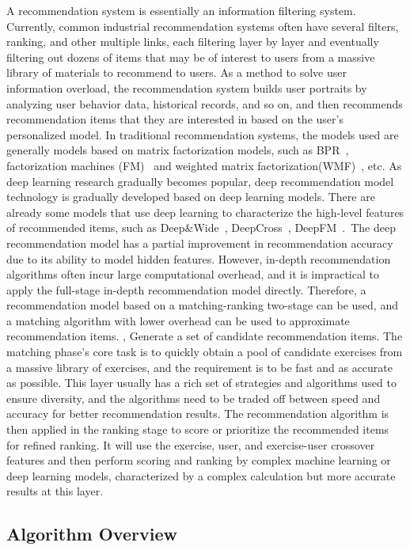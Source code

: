 A recommendation system is essentially an information filtering system. Currently, common industrial recommendation systems often have several filters, ranking, and other multiple links, each filtering layer by layer and eventually filtering out dozens of items that may be of interest to users from a massive library of materials to recommend to users. As a method to solve user information overload, the recommendation system builds user portraits by analyzing user behavior data, historical records, and so on, and then recommends recommendation items that they are interested in based on the user's personalized model. In traditional recommendation systems, the models used are generally models based on matrix factorization models, such as BPR~\cite{rendle2012bpr}, factorization machines (FM)~\cite{koren2008factorization} and weighted matrix factorization(WMF)~\cite{hu2008collaborative}, etc. As deep learning research gradually becomes popular, deep recommendation model technology is gradually developed based on deep learning models. There are already some models that use deep learning to characterize the high-level features of recommended items, such as Deep\&Wide~\cite{cheng2016wide}, DeepCross~\cite{shan2016deep}, DeepFM~\cite{guo2017deepfm}.\ The deep recommendation model has a partial improvement in recommendation accuracy due to its ability to model hidden features. However, in-depth recommendation algorithms often incur large computational overhead, and it is impractical to apply the full-stage in-depth recommendation model directly. Therefore, a recommendation model based on a matching-ranking two-stage can be used, and a matching algorithm with lower overhead can be used to approximate recommendation items. , Generate a set of candidate recommendation items. The matching phase's core task is to quickly obtain a pool of candidate exercises from a massive library of exercises, and the requirement is to be fast and as accurate as possible. This layer usually has a rich set of strategies and algorithms used to ensure diversity, and the algorithms need to be traded off between speed and accuracy for better recommendation results. The recommendation algorithm is then applied in the ranking stage to score or prioritize the recommended items for refined ranking. It will use the exercise, user, and exercise-user crossover features and then perform scoring and ranking by complex machine learning or deep learning models, characterized by a complex calculation but more accurate results at this layer.

\subsection{Algorithm Overview}

